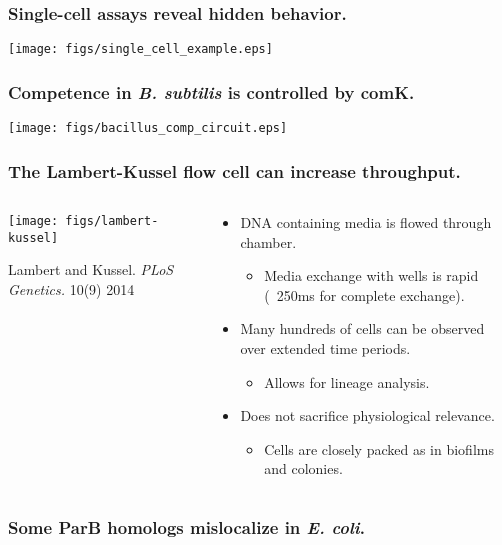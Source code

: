 

\begin{frame}
	\frametitle{Single-cell assays reveal hidden behavior.}
	\centerline{\texttt{[image: figs/single\_cell\_example.eps]}}
\end{frame}

\begin{frame}
	\frametitle{Competence in \emph{B. subtilis} is controlled by
	{\small com}K.}
	\centerline{\texttt{[image: figs/bacillus\_comp\_circuit.eps]}}
\end{frame}

\begin{frame}
	\frametitle{The Lambert-Kussel flow cell can increase throughput.}
	\begin{columns}[T]
		\begin{column}{0.48\textwidth}
			\centerline{\texttt{[image: figs/lambert-kussel]}}
			{\tiny Lambert and Kussel. \textit{PLoS Genetics.}
		10(9) 2014}
	\end{column}
	\begin{column}{0.48\textwidth}
		\begin{itemize}
			\item DNA containing media is flowed through chamber.
				\begin{itemize}
					\item Media exchange with wells is rapid
						(~250ms for complete exchange).
				\end{itemize}
			\item Many hundreds of cells can be observed
				over extended time periods.
				\begin{itemize}
					\item Allows for lineage analysis.
				\end{itemize}
			\item Does not sacrifice physiological relevance.
				\begin{itemize}
					\item Cells are closely packed as in
						biofilms and colonies.
				\end{itemize}
		\end{itemize}
	\end{column}
\end{columns}
\end{frame}



\begin{frame}
	\frametitle{Some P{\small ar}B homologs mislocalize in \emph{E. coli}.}


\end{frame}






